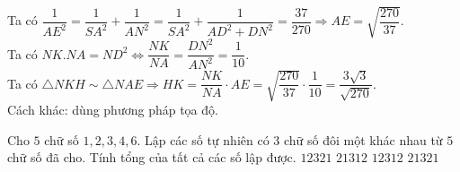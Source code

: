 \begin{ex}
{	Ta có $ \dfrac{1}{AE^2}  = \dfrac{1}{SA^2} + \dfrac{1}{AN^2} = \dfrac{1}{SA^2} + \dfrac{1}{AD^2 + DN^2} = \dfrac{37}{270} \Rightarrow AE = \sqrt{ \dfrac{270}{37} }$.\\[5pt]
	Ta có $ NK.NA = ND^2 \Leftrightarrow \dfrac{NK}{NA} = \dfrac{DN^2}{AN^2} = \dfrac{1}{10} $.\\[4pt]
	Ta có $ \triangle NKH \sim \triangle NAE \Rightarrow HK = \dfrac{NK}{NA} \cdot AE = \sqrt{\dfrac{270}{37}} \cdot \dfrac{1}{10} = \dfrac{3 \sqrt{3}}{\sqrt{270}} $.\\
	Cách khác: dùng phương pháp tọa độ.
	}	
\end{ex}	
\begin{ex}%
	Cho $ 5 $ chữ số $ 1, 2, 3, 4, 6 $. Lập các số tự nhiên có $ 3 $ chữ số đôi một khác nhau từ $ 5 $ chữ số đã cho. Tính tổng của tất cả các số lập được.
	\choice
	{$ 12321 $}
	{\True $ 21312 $}
	{$ 12312 $}
	{$ 21321 $}
\end{ex}	
